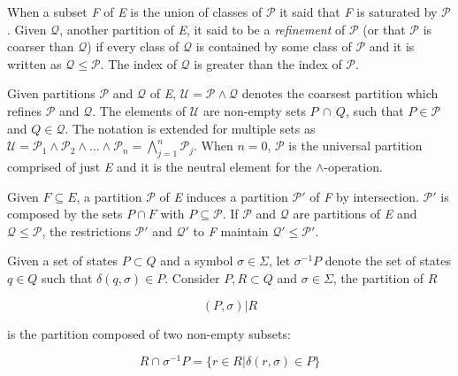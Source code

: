 {When a subset \textit{F} of \textit{E} is the union of classes of $\mathcal{P}$ it said that \textit{F} is saturated by $\mathcal{P}$. Given $\mathcal{Q}$, another partition of \textit{E}, it said to be a \textit{refinement} of $\mathcal{P}$ (or that $\mathcal{P}$ is coarser than $\mathcal{Q}$) if every class of $\mathcal{Q}$ is contained by some class of $\mathcal{P}$ and it is written as $\mathcal{Q} \leq \mathcal{P}$. The index of $\mathcal{Q}$ is greater than the index of $\mathcal{P}$.

Given partitions $\mathcal{P}$ and $\mathcal{Q}$ of \textit{E}, $\mathcal{U} = \mathcal{P}\wedge\mathcal{Q}$ denotes the coarsest partition which refines $\mathcal{P}$ and $\mathcal{Q}$. The elements of $\mathcal{U}$ are non-empty sets $P\,\cap\,Q$, such that $P \in\mathcal{P}$ and 	$Q \in\mathcal{Q}$. The notation is extended for multiple sets as $\mathcal{U} = \mathcal{P}_1 \wedge \mathcal{P}_2 \wedge \ldots \wedge \mathcal{P}_n = \bigwedge\limits_{j=1}^n\mathcal{P}_j$. When $n=0$,  $\mathcal{P}$ is the universal partition comprised of just \textit{E} and it is the neutral element for the $\wedge$-operation.

Given $F\subseteq E$, a partition $\mathcal{P}$ of \textit{E} induces a partition $\mathcal{P}'$  
of \textit{F} by intersection. $\mathcal{P}'$ is composed by the sets $P\cap F$ with $P\subseteq \mathcal{P}$. If $\mathcal{P}$ and $\mathcal{Q}$ are partitions of \textit{E} and $\mathcal{Q} \leq \mathcal{P}$, the restrictions $\mathcal{P}'$ and $\mathcal{Q}'$ to \textit{F} maintain $\mathcal{Q}' \leq \mathcal{P}'$.



Given a set of states $P \subset Q$ and a symbol $\sigma \in \Sigma$, let $\sigma^{-1}\textit{P}$ denote the set of states $q\in Q$ such that $\delta(q, \sigma) \in P$. Consider $P, R\subset Q$ and $\sigma \in \Sigma$, the partition of $R$

\[
(P, \sigma)|R
\]

\noindent is the partition composed of two non-empty subsets:

\begin{equation}\label{eq:splitintersec}
R\cap\sigma^{-1}P = \{r \in R | \delta(r,\sigma) \in P\}
\end{equation}

}
